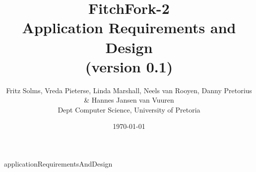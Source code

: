 \documentclass[titlepage]{article}
\title{FitchFork-2 \\ Application Requirements and Design \\
          (version 0.1)}
\author{Fritz Solms, Vreda Pieterse, Linda Marshall, Neels van Rooyen, Danny Pretorius \& Hannes Jansen van Vuuren \\ Dept Computer Science, University of Pretoria}
\date{\today}
\begin{document}
\maketitle

\tableofcontents

\newpage

{applicationRequirementsAndDesign}
\end{document}
